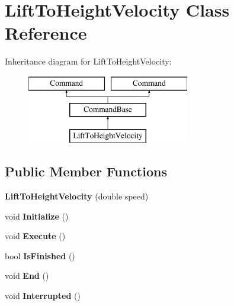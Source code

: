 \hypertarget{class_lift_to_height_velocity}{}\section{Lift\+To\+Height\+Velocity Class Reference}
\label{class_lift_to_height_velocity}
Inheritance diagram for Lift\+To\+Height\+Velocity\+:\begin{figure}[H]
\begin{center}
\leavevmode
\includegraphics[height=3.000000cm]{class_lift_to_height_velocity}
\end{center}
\end{figure}
\subsection*{Public Member Functions}
\begin{DoxyCompactItemize}
\item 
\hypertarget{class_lift_to_height_velocity_a1c5bf1a887687b2c6a8768df260c983a}{}{\bfseries Lift\+To\+Height\+Velocity} (double speed)\label{class_lift_to_height_velocity_a1c5bf1a887687b2c6a8768df260c983a}

\item 
\hypertarget{class_lift_to_height_velocity_a526c331b5b5fb39f5e96ac3ebfb7202f}{}void {\bfseries Initialize} ()\label{class_lift_to_height_velocity_a526c331b5b5fb39f5e96ac3ebfb7202f}

\item 
\hypertarget{class_lift_to_height_velocity_a751bc1d502d16a64f02dae0aef53dda9}{}void {\bfseries Execute} ()\label{class_lift_to_height_velocity_a751bc1d502d16a64f02dae0aef53dda9}

\item 
\hypertarget{class_lift_to_height_velocity_a9306a5fa5331d2568e78f480d530f09d}{}bool {\bfseries Is\+Finished} ()\label{class_lift_to_height_velocity_a9306a5fa5331d2568e78f480d530f09d}

\item 
\hypertarget{class_lift_to_height_velocity_afb3af180b244bbc9cd49c3ac64fa9fcd}{}void {\bfseries End} ()\label{class_lift_to_height_velocity_afb3af180b244bbc9cd49c3ac64fa9fcd}

\item 
\hypertarget{class_lift_to_height_velocity_a17d8e48fb04b90e777c5e0325ac73f5f}{}void {\bfseries Interrupted} ()\label{class_lift_to_height_velocity_a17d8e48fb04b90e777c5e0325ac73f5f}

\end{DoxyCompactItemize}

